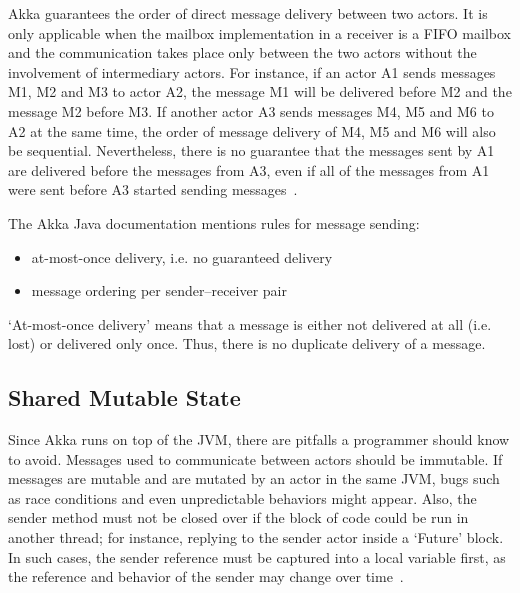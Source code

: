   Akka guarantees the order of direct message delivery between two actors. It is only applicable when the mailbox implementation in a receiver is a FIFO mailbox and the communication takes place only between the two actors without the involvement of intermediary actors. For instance, if an actor A1 sends messages M1, M2 and M3 to actor A2, the message M1 will be delivered before M2 and the message M2 before M3. If another actor A3 sends messages M4, M5 and M6 to A2 at the same time, the order of message delivery of M4, M5 and M6 will also be sequential. Nevertheless, there is no guarantee that the messages sent by A1 are delivered before the messages from A3, even if all of the messages from A1 were sent before A3 started sending messages~\cite{akkaJavaDoc}.

  The Akka Java documentation mentions rules for message sending: \cite{akkaJavaDoc}
  \begin{itemize}
    \item at-most-once delivery, i.e. no guaranteed delivery
    \item message ordering per sender–receiver pair
  \end{itemize}

‘At-most-once delivery’ means that a message is either not delivered at all (i.e. lost) or delivered only once. Thus, there is no duplicate delivery of a message.

  \subsection{Shared Mutable State}
  Since Akka runs on top of the JVM, there are pitfalls a programmer should know to avoid. Messages used to communicate between actors should be immutable. If messages are mutable and are mutated by an actor in the same JVM, bugs such as race conditions and even unpredictable behaviors might appear. Also, the sender method must not be closed over if the block of code could be run in another thread; for instance, replying to the sender actor inside a ‘Future’ block. In such cases, the sender reference must be captured into a local variable first, as the reference and behavior of the sender may change over time~\cite{akkaJavaDoc}.


